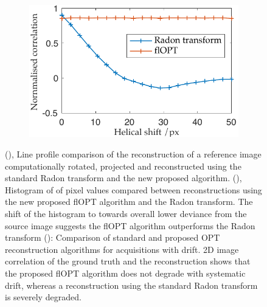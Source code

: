 \documentclass{osa-article}
\begin{document}
\begin{figure}
\begin{subfigure}[t]{0.45\linewidth}
    \caption{}\label{fig:flopt_histogram}
  \end{subfigure}\\
  \begin{subfigure}[t]{0.45\linewidth}
    \centering
    \includegraphics[width=\linewidth]{./figures/results/correlation_helicity}
    \caption{}\label{fig:helical_comparison}
  \end{subfigure}
  \caption{
  (), Line profile comparison of the reconstruction of a reference image computationally rotated, projected and reconstructed using the standard Radon transform and the new proposed algorithm.
  (), Histogram of of pixel values compared between reconstructions using the new proposed flOPT algorithm and the Radon transform.
  The shift of the histogram to towards overall lower deviance from the source image suggests the flOPT algorithm outperforms the Radon transform
  (): Comparison of standard and proposed OPT reconstruction algorithms for acquisitions with drift.
  2D image correlation of the ground truth and the reconstruction shows that the proposed flOPT algorithm does not degrade with systematic drift, whereas a reconstruction using the standard Radon transform is severely degraded.}
\end{figure}
\end{document}
